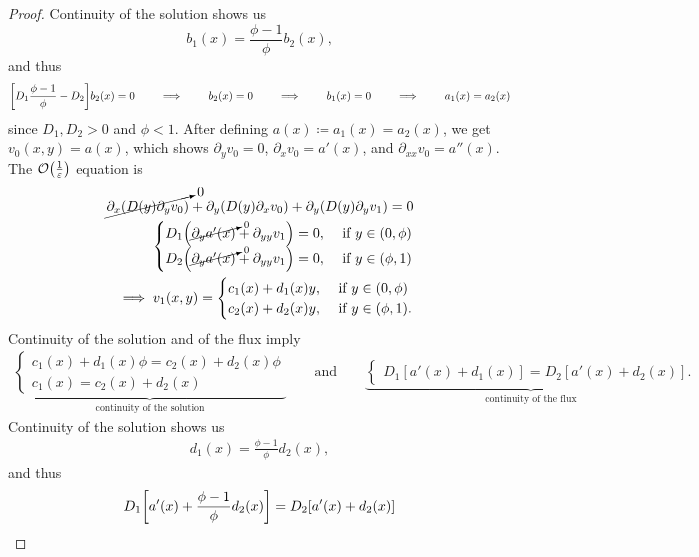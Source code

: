 \documentclass{article} %
\theoremstyle{plain}
\newcommand{\dy}{\partial_y}
\newcommand{\dyy}{\partial_{yy}}
\newcommand{\dxx}{\partial_{xx}}
\newcommand{\dx}{\partial_x}
\newcommand{\E}{\varepsilon}
\numberwithin{equation}{section} %
\numberwithin{figure}{section} %
\numberwithin{table}{section} %
\begin{document}
\begin{proof}
    Continuity of the solution shows us $$b_1(x) = \frac{\phi - 1}{\phi}b_2(x),$$ and thus
    \begin{align*}
        \qty[D_1\frac{\phi - 1}{\phi} - D_2]b_2(x) = 0 \qquad \implies \qquad b_2(x) = 0 \qquad \implies \qquad b_1(x) = 0 \qquad \implies \qquad a_1(x) = a_2(x)
    \end{align*}
    since $D_1,D_2 > 0$ and $\phi < 1$.  After defining $a(x) \coloneqq a_1(x) = a_2(x)$, we get $v_0(x,y) = a(x)$, which shows $\dy v_0 = 0$, $\dx v_0 = a'(x)$, and $\dxx v_0 = a''(x)$.  The $\order{\frac{1}{\E}}$ equation is
    \begin{align*}
        \cancelto{0}{\dx\qty(D(y)\dy v_0)} + \dy\qty(D(y)\dx v_0) + \dy(D(y)\dy v_1) = 0 \\
        \begin{cases}
            D_1 \qty(\cancelto{0}{\dy a'(x)} + \dyy v_1) = 0, & \text{ if } y \in (0, \phi) \\
            D_2 \qty(\cancelto{0}{\dy a'(x)} + \dyy v_1) = 0, & \text{ if } y \in (\phi, 1)
        \end{cases} \\
        \implies v_1(x,y) = \begin{cases}
            c_1(x) + d_1(x) y, & \text{ if } y \in (0, \phi) \\
            c_2(x) + d_2(x) y, & \text{ if } y \in (\phi, 1).
        \end{cases}
    \end{align*}
    Continuity of the solution and of the flux imply
    \begin{align*}
        \underbrace{\begin{cases}
                    c_1(x) + d_1(x)\phi = c_2(x) + d_2(x)\phi \\
                    c_1(x) = c_2(x) + d_2(x)
                \end{cases}}_{\text{continuity of the solution}} \qquad \text{and} \qquad \underbrace{\begin{cases}
                    D_1[a'(x) + d_1(x)] = D_2[a'(x) + d_2(x)].
                \end{cases}}_{\text{continuity of the flux}}
    \end{align*}
    Continuity of the solution shows us
    \begin{align*}
        d_1(x) = \frac{\phi - 1}{\phi}d_2(x),
    \end{align*}
    and thus
    \begin{align*}
        D_1\qty[a'(x) + \frac{\phi - 1}{\phi}d_2(x)] = D_2\qty[a'(x) + d_2(x)] \\

\end{align*}
\end{proof}
\end{document}
